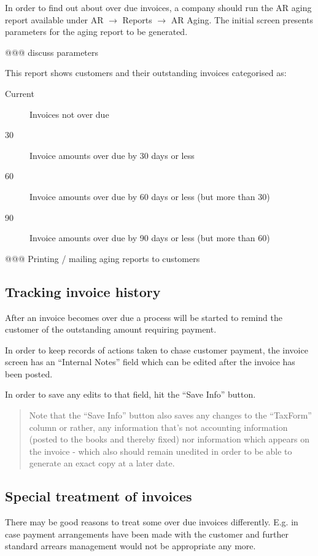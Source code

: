 In order to find out about over due invoices, a company should run the AR
aging report available under AR $\rightarrow$ Reports $\rightarrow$ AR Aging.
The initial screen presents parameters for the aging report to be generated.

@@@ discuss parameters

This report shows customers and their outstanding invoices categorised as:

\begin{description}
\item [Current] Invoices not over due
\item [30] Invoice amounts over due by 30 days or less
\item [60] Invoice amounts over due by 60 days or less (but more than 30)
\item [90] Invoice amounts over due by 90 days or less (but more than 60)
\end{description}


@@@ Printing / mailing aging reports to customers


\subsection{Tracking invoice history}

After an invoice becomes over due a process will be started to remind
the customer of the outstanding amount requiring payment.

In order to keep records of actions taken to chase customer payment,
the invoice screen has an ``Internal Notes'' field which can be edited
after the invoice has been posted.

In order to save any edits to that field, hit the ``Save Info'' button.

\begin{quotation}
Note that the ``Save Info'' button also saves any changes to the ``TaxForm'' column or
rather, any information that's not accounting information (posted to the books and
thereby fixed) nor information which appears on the invoice - which also should remain
unedited in order to be able to generate an exact copy at a later date.
\end{quotation}


\subsection{Special treatment of invoices}

There may be good reasons to treat some over due invoices differently. E.g. in case
payment arrangements have been made with the customer and further standard arrears
management would not be appropriate any more.

